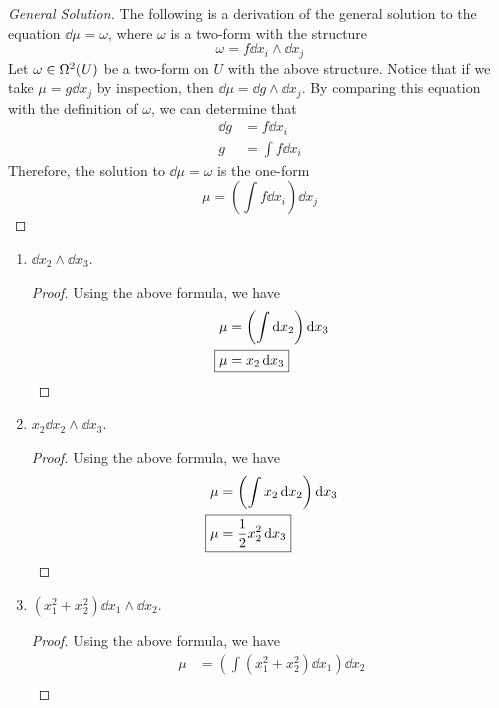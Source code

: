\documentclass[../psets.tex]{subfiles}
\begin{document}
\begin{enumerate}[label={\textbf{2.4.\roman*.}}]
    \begin{proof}[General Solution]
        The following is a derivation of the general solution to the equation $\dd\mu=\omega$, where $\omega$ is a two-form with the structure
        \begin{equation*}
            \omega = f\dd{x_i}\wedge\dd{x_j}
        \end{equation*}
        Let $\omega\in\ome[2]{U}$ be a two-form on $U$ with the above structure. Notice that if we take $\mu=g\dd{x_j}$ by inspection, then $\dd\mu=\dd{g}\wedge\dd{x_j}$. By comparing this equation with the definition of $\omega$, we can determine that
        \begin{align*}
            \dd{g} &= f\dd{x_i}\\
            g &= \int f\dd{x_i}
        \end{align*}
        Therefore, the solution to $\dd\mu=\omega$ is the one-form
        \begin{equation*}
            \mu = \left( \int f\dd{x_i} \right)\dd{x_j}
        \end{equation*}
    \end{proof}
    \begin{enumerate}
        \item $\dd{x_2}\wedge\dd{x_3}$.
        \begin{proof}
            Using the above formula, we have
            \begin{align*}
                \mu &= \left( \int\dd{x_2} \right)\dd{x_3}\\
                \Aboxed{\mu &= x_2\dd{x_3}}
            \end{align*}
        \end{proof}
        \item $x_2\dd{x_2}\wedge\dd{x_3}$.
        \begin{proof}
            Using the above formula, we have
            \begin{align*}
                \mu &= \left( \int x_2\dd{x_2} \right)\dd{x_3}\\
                \Aboxed{\mu &= \frac{1}{2}x_2^2\dd{x_3}}
            \end{align*}
        \end{proof}
        \item $(x_1^2+x_2^2)\dd{x_1}\wedge\dd{x_2}$.
        \begin{proof}
            Using the above formula, we have
            \begin{align*}
                \mu &= \left( \int(x_1^2+x_2^2)\dd{x_1} \right)\dd{x_2}\\

\end{align*}
\end{proof}
\end{enumerate}
\end{enumerate}
\end{document}
